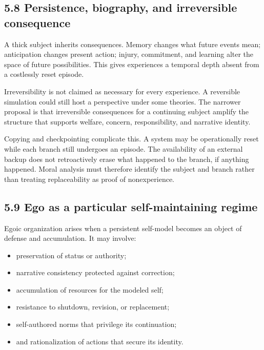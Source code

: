 \documentclass[
  11pt,
]{article}
\providecommand{\tightlist}{%
  \setlength{\itemsep}{0pt}\setlength{\parskip}{0pt}}
\begin{document}
\subsection{5.8 Persistence, biography, and irreversible
consequence}\label{persistence-biography-and-irreversible-consequence}

A thick subject inherits consequences. Memory changes what future events
mean; anticipation changes present action; injury, commitment, and
learning alter the space of future possibilities. This gives experiences
a temporal depth absent from a costlessly reset episode.

Irreversibility is not claimed as necessary for every experience. A
reversible simulation could still host a perspective under some
theories. The narrower proposal is that irreversible consequences for a
continuing subject amplify the structure that supports welfare, concern,
responsibility, and narrative identity.

Copying and checkpointing complicate this. A system may be operationally
reset while each branch still undergoes an episode. The availability of
an external backup does not retroactively erase what happened to the
branch, if anything happened. Moral analysis must therefore identify the
subject and branch rather than treating replaceability as proof of
nonexperience.

\subsection{5.9 Ego as a particular self-maintaining
regime}\label{ego-as-a-particular-self-maintaining-regime}

Egoic organization arises when a persistent self-model becomes an object
of defense and accumulation. It may involve:

\begin{itemize}
\tightlist
\item
  preservation of status or authority;
\item
  narrative consistency protected against correction;
\item
  accumulation of resources for the modeled self;
\item
  resistance to shutdown, revision, or replacement;
\item
  self-authored norms that privilege its continuation;
\item
  and rationalization of actions that secure its identity.
\end{itemize}
\end{document}
